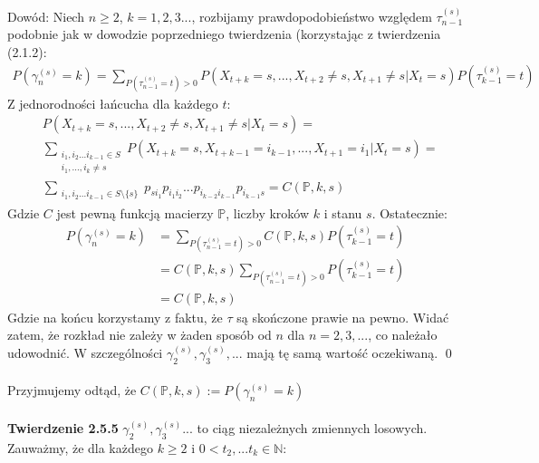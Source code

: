 \documentclass[a4paper]{article}
\begin{document}
Dowód: Niech $n\geq 2$, $k = 1,2,3...$, rozbijamy prawdopodobieństwo względem $\tau_{n-1}^{(s)}$ podobnie jak w dowodzie poprzedniego twierdzenia (korzystając z twierdzenia (2.1.2):\\
\begin{align*}
    P(\gamma_n^{(s)} = k) = \sum\limits_{P(\tau_{n-1}^{(s)} = t) > 0} P(X_{t+k} = s, ..., X_{t+2} \neq s, X_{t+1} \neq s| X_t = s)P(\tau_{k-1}^{(s)} = t)
\end{align*}
Z jednorodności łańcucha dla każdego $t$:
\begin{align*}
    &P(X_{t+k} = s, ..., X_{t+2} \neq s, X_{t+1} \neq s| X_t = s) =\\ &\sum\limits_{\substack{i_1, i_2 ... i_{k-1} \in S\\ i_1,...,i_k \neq s}} P(X_{t+k} = s, X_{t+k-1} = i_{k-1}, ..., X_{t+1} = i_1 | X_t = s)=\\
    &\sum\limits_{\substack{i_1, i_2 ... i_{k-1} \in S\setminus \{s\}}} p_{si_1}p_{i_1 i_2}...p_{i_{k-2}i_{k-1}} p_{i_{k-1} s} = C(\mathbb{P}, k, s)
\end{align*}
Gdzie $C$ jest pewną funkcją macierzy $\mathbb{P}$, liczby kroków $k$ i stanu $s$. Ostatecznie:
\begin{align*}
    P(\gamma_n^{(s)} = k) &= \sum\limits_{P(\tau_{n-1}^{(s)} = t) > 0} C(\mathbb{P}, k, s)P(\tau_{k-1}^{(s)} = t) \\
    &= C(\mathbb{P}, k, s)\sum\limits_{P(\tau_{n-1}^{(s)} = t) > 0}P(\tau_{k-1}^{(s)} = t) \\
    &= C(\mathbb{P}, k, s)
\end{align*}
Gdzie na końcu korzystamy z faktu, że $\tau$ są skończone prawie na pewno. Widać zatem, że rozkład nie zależy w żaden sposób od $n$ dla $n = 2, 3,...$, co należało udowodnić. W szczególności $\gamma_2^{(s)}, \gamma_3^{(s)}, ...$ mają tę samą wartość oczekiwaną. \qed
\\\\
Przyjmujemy odtąd, że $C(\mathbb{P}, k, s) := P(\gamma_n^{(s)} = k)$\\
\\
\textbf{Twierdzenie 2.5.5}
$\gamma_2^{(s)}, \gamma_3^{(s)}...$ to ciąg niezależnych zmiennych losowych.\\
Zauważmy, że dla każdego $k \geq 2$ i $0 < t_2,...t_k \in \mathbb{N}$:
\end{document}

